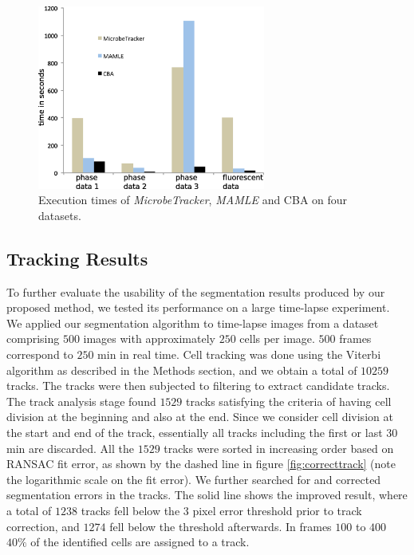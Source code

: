 \documentclass[journal]{IEEEtran}
\begin{document}
\begin{figure}[h]
	\begin{center}
		
		\includegraphics[width=7.5cm]{timingrgb.png}					
		\caption{Execution times of \textit{MicrobeTracker}, \textit{MAMLE} and CBA on four datasets.}
		\label{fig:timing}
	\end{center}
\end{figure}
\subsection{Tracking Results}
To further evaluate the usability of the segmentation results produced by our proposed method, we tested its performance on a large time-lapse experiment. We applied our segmentation algorithm to time-lapse images from a dataset comprising $500$ images with approximately $250$ cells per image. $500$ frames correspond to $250$ min in real time. Cell tracking was done using the Viterbi algorithm as described in the Methods section, and we obtain a total of $10259$ tracks. The tracks were then subjected to filtering to extract candidate tracks. The track analysis stage found $1529$ tracks satisfying the criteria of having cell division at the beginning and also at the end. Since we consider cell division at the start and end of the track, essentially all tracks including the first or last $30$ min are discarded. All the $1529$ tracks were sorted in increasing order based on RANSAC fit error, as shown by the dashed line in figure \ref{fig:correcttrack} (note the logarithmic scale on the fit error). We further searched for and corrected segmentation errors in the tracks. The solid line shows the improved result, where a total of $1238$ tracks fell below the $3$ pixel error threshold prior to track correction, and $1274$ fell below the threshold afterwards.  In frames $100$ to $400$ $40\% $ of the identified cells are assigned to a track. 
\end{document}
